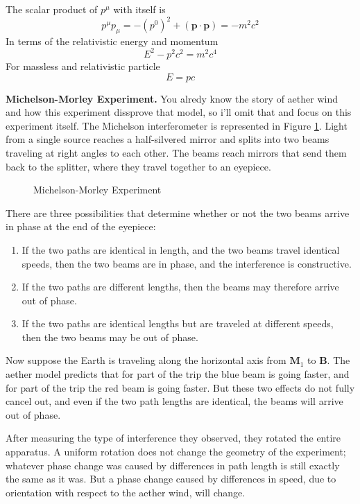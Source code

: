 \documentclass[../../../main.tex]{subfiles}
\begin{document}
The scalar product of $p^\mu$ with itself is
\begin{equation*}
    p^\mu p_\mu=-(p^0)^2+(\mathbf{p}\cdot\mathbf{p})=-m^2c^2
\end{equation*}
In terms of the relativistic energy and momentum
\begin{equation*}
    E^2-p^2c^2=m^2c^4
\end{equation*}
For massless and relativistic particle
\begin{equation*}
    E=pc
\end{equation*}

\textbf{Michelson-Morley Experiment.} You alredy know the story of aether wind and how this experiment dissprove that model, so i'll omit that and focus on this experiment itself. The Michelson interferometer is represented in Figure \ref{fig:MMExperiment1}. Light from a single source reaches a half-silvered mirror and splits into two beams traveling at right angles to each other. The beams reach mirrors that send them back to the splitter, where they travel together to an eyepiece.
\begin{figure}
    \centering
    \caption{Michelson-Morley Experiment}
    \label{fig:MMExperiment1}
\end{figure}
There are three possibilities that determine whether or not the two beams arrive in phase at the end of the eyepiece:
\begin{enumerate}
    \item If the two paths are identical in length, and the two beams travel identical speeds, then
    the two beams are in phase, and the interference is constructive.
    \item If the two paths are different lengths, then the beams may therefore arrive out of phase.
    \item If the two paths are identical lengths but are traveled at different speeds, then the two beams may be out of phase.
\end{enumerate}
Now suppose the Earth is traveling along the horizontal axis from $\mathbf{M}_1$ to \textbf{B}. The aether model predicts that for part of the trip the blue beam is going faster, and for part of the trip the red beam is going faster. But these two effects do not fully cancel out, and even if the two path lengths are identical, the beams will arrive out of phase.

After measuring the type of interference they observed, they rotated the entire apparatus. A uniform rotation does not change the geometry of the experiment; whatever phase change was caused by differences in path length is still exactly the same as it was. But a phase change caused by differences in speed, due to orientation with respect to the aether wind, will change. 
\end{document}
